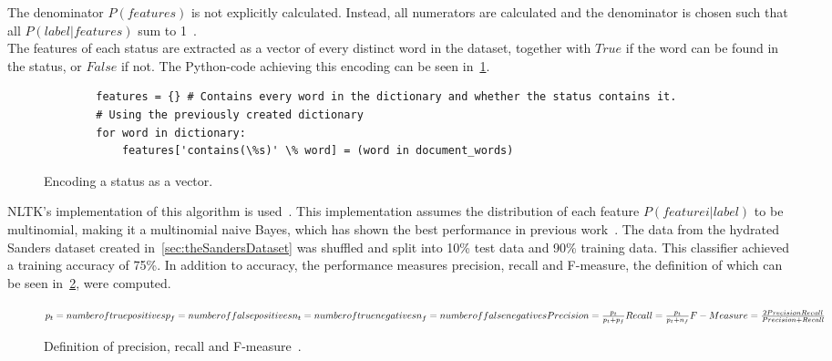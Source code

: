 The denominator $P(features)$ is not explicitly calculated.
Instead, all numerators are calculated and the denominator is chosen such that all $P(label|features)$ sum to 1~\cite{nltkDocs}.
\\
The features of each status are extracted as a vector of every distinct word in the dataset,
together with $True$ if the word can be found in the status, or $False$ if not.
The Python-code achieving this encoding can be seen in~\ref{code:extract_features}.

\begin{figure}
    \caption{Encoding a status as a vector.}
    \label{code:extract_features}
    \begin{verbatim}
        features = {} # Contains every word in the dictionary and whether the status contains it.
        # Using the previously created dictionary
        for word in dictionary:
            features['contains(\%s)' \% word] = (word in document_words)
    \end{verbatim}
\end{figure}

NLTK's implementation of this algorithm is used~\cite{nltkDocs}.
This implementation assumes the distribution of each feature $P(feature i|label)$ to be multinomial,
making it a multinomial naive Bayes, which has shown the best performance in previous work~\cite{Go2009}.
The data from the hydrated Sanders dataset created in~\ref{sec:theSandersDataset} was shuffled and split into 10\% test data and 90\% training data.
This classifier achieved a training accuracy of 75\%.
In addition to accuracy, the performance measures precision, recall and F-measure,
the definition of which can be seen in~\ref{math:precision_recall_fmeasure}, were computed.

\begin{figure}
    \caption{Definition of precision, recall and F-measure~\cite{Hong2010}.}
    \label{math:precision_recall_fmeasure}
    \begin{math}
        p_t = number of true positives
        p_f = number of false positives
        n_t = number of true negatives
        n_f = number of false negatives
        \\
        Precision = \frac{p_t}{p_t + p_f}
        Recall = \frac{p_t}{p_t + n_f}
        \\
        F-Measure = \frac{2 \* Precision \* Recall}{Precision + Recall}
    \end{math}
\end{figure}

